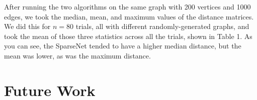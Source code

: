 \documentclass[conference]{IEEEtran}
\begin{document}
After running the two algorithms on the same graph with 200 vertices and 1000 edges, we took the median, mean, and maximum values of the distance matrices.
We did this for $n=80$ trials, all with different randomly-generated graphs, and took the mean of those three statistics across all the trials, shown in Table 1.
As you can see, the SparseNet tended to have a higher median distance, but the mean was lower, as was the maximum distance.

\section{Future Work}
\end{document}
